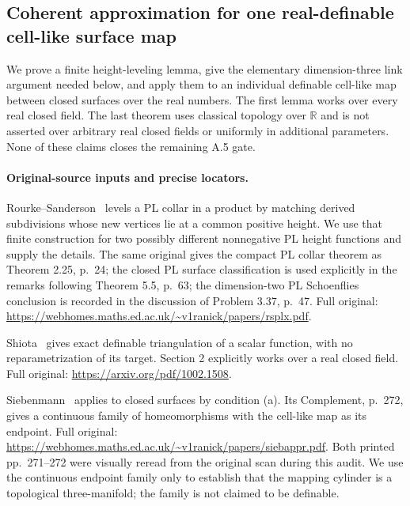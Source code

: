 \subsection{Coherent approximation for one real-definable cell-like surface map}

We prove a finite height-leveling lemma, give the elementary dimension-three
link argument needed below, and apply them to an individual definable cell-like
map between closed surfaces over the real numbers. The first lemma works over
every real closed field. The last theorem uses classical topology over
$\mathbb R$ and is not asserted over arbitrary real closed fields or uniformly
in additional parameters. None of these claims closes the remaining A.5 gate.

\paragraph{Original-source inputs and precise locators.}
Rourke--Sanderson~\cite[Lemma 4.23, p.~58]{RourkeSanderson1972} levels a PL collar in a product by matching derived
subdivisions whose new vertices lie at a common positive height. We use that
finite construction for two possibly different nonnegative PL height functions
and supply the details. The same original gives the compact PL collar theorem
as Theorem 2.25, p.~24; the closed PL surface classification is used explicitly
in the remarks following Theorem 5.5, p.~63; the dimension-two PL Schoenflies
conclusion is recorded in the discussion of Problem 3.37, p.~47. Full original:
\url{https://webhomes.maths.ed.ac.uk/~v1ranick/papers/rsplx.pdf}.

Shiota~\cite[Theorem 2.2(1), p.~6]{A5-Shiota} gives exact definable
triangulation of a scalar function, with no reparametrization of its target.
Section 2 explicitly works over a real closed field. Full original:
\url{https://arxiv.org/pdf/1002.1508}.

Siebenmann~\cite[Approximation Theorem A, p.~271]{Siebenmann1972Approximation} applies to closed surfaces by condition (a).
Its Complement, p.~272, gives a continuous family of homeomorphisms with the
cell-like map as its endpoint. Full original:
\url{https://webhomes.maths.ed.ac.uk/~v1ranick/papers/siebappr.pdf}.
Both printed pp.~271--272 were visually reread from the original scan during
this audit. We use the continuous endpoint family only to establish that the
mapping cylinder is a topological three-manifold; the family is not claimed
to be definable.

